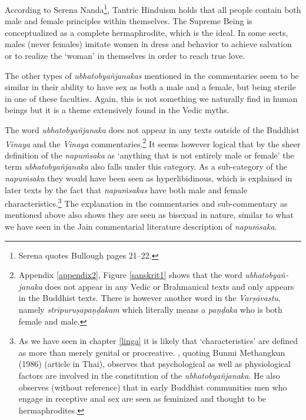 According to Serena Nanda\footnote{Serena \cite{nanda} quotes Bullough pages 21–22.}, Tantric Hinduism holds that all people contain both male and female principles within themselves. The Supreme Being is conceptualized as a complete hermaphrodite, which is the ideal. In some sects, males (never females) imitate women in dress and behavior to achieve salvation or to realize the `woman' in themselves in order to reach true love.

The other types of {\em ubhatob­yañ­janakas} mentioned in the commentaries seem to be similar in their ability to have sex as both a male and a female, but being sterile in one of these faculties. Again, this is not something we naturally find in human beings but it is a theme extensively found in the Vedic myths.


The word {\em ubhatob­yañ­janaka} does not appear in any texts outside of the Buddhist {\em Vinaya} and the {\em Vinaya} commentaries.\footnote{Appendix \ref{appendix2}, Figure \ref{sanskrit1} shows that the word {\em ubhatob­yañ­janaka} does not appear in any Vedic or Brahmanical texts and only appears in the Buddhist texts. There is however another word in the {\em Varṣāvastu}, namely {\em strīpuruṣapaṇḍakam} which literally means a {\em paṇḍaka} who is both female and male.} It seems however logical that by the sheer definition of the {\em napuṁsaka} as `anything that is not entirely male or female' the term {\em ubhatob­yañ­janaka} also falls under this category. As a sub-category of the {\em napuṁsaka} they would have been seen as hyperlibidinous, which is explained in later texts by the fact that {\em napuṁsakas} have both male and female characteristics.\footnote{As we have seen in chapter \ref{linga} it is likely that `characteristics' are defined as more than merely genital or procreative. \cite{jackson}, quoting Bunmi Methangkun (1986) (article in Thai), observes that psychological as well as physiological factors are involved in the constitution of the {\em ubhatob­yañ­janaka}. He also observes (without reference) that in early Buddhist communities men who engage in receptive anal sex are seen as feminized and thought to be hermaphrodites.} The explanation in the commentaries and sub-commentary as mentioned above also shows they are seen as bisexual in nature, similar to what we have seen in the Jain commentarial literature description of {\em napuṁsaka}.

